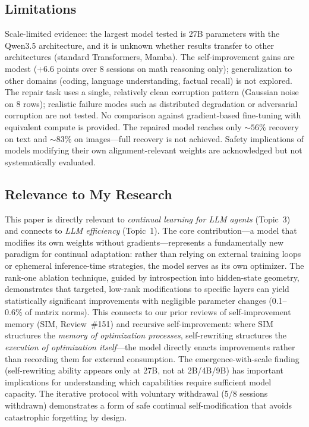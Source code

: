 \documentclass[11pt,a4paper]{article}
\begin{document}
\subsection{Limitations}
Scale-limited evidence: the largest model tested is 27B parameters with the Qwen3.5 architecture, and it is unknown whether results transfer to other architectures (standard Transformers, Mamba). The self-improvement gains are modest (+6.6 points over 8 sessions on math reasoning only); generalization to other domains (coding, language understanding, factual recall) is not explored. The repair task uses a single, relatively clean corruption pattern (Gaussian noise on 8 rows); realistic failure modes such as distributed degradation or adversarial corruption are not tested. No comparison against gradient-based fine-tuning with equivalent compute is provided. The repaired model reaches only ${\sim}56\%$ recovery on text and ${\sim}83\%$ on images---full recovery is not achieved. Safety implications of models modifying their own alignment-relevant weights are acknowledged but not systematically evaluated.

\subsection{Relevance to My Research}
This paper is directly relevant to \emph{continual learning for LLM agents} (Topic~3) and connects to \emph{LLM efficiency} (Topic~1). The core contribution---a model that modifies its own weights without gradients---represents a fundamentally new paradigm for continual adaptation: rather than relying on external training loops or ephemeral inference-time strategies, the model serves as its own optimizer. The rank-one ablation technique, guided by introspection into hidden-state geometry, demonstrates that targeted, low-rank modifications to specific layers can yield statistically significant improvements with negligible parameter changes (0.1--0.6\% of matrix norms). This connects to our prior reviews of self-improvement memory (SIM, Review~\#151) and recursive self-improvement: where SIM structures the \emph{memory of optimization processes}, self-rewriting structures the \emph{execution of optimization itself}---the model directly enacts improvements rather than recording them for external consumption. The emergence-with-scale finding (self-rewriting ability appears only at 27B, not at 2B/4B/9B) has important implications for understanding which capabilities require sufficient model capacity. The iterative protocol with voluntary withdrawal (5/8 sessions withdrawn) demonstrates a form of safe continual self-modification that avoids catastrophic forgetting by design.
\end{document}
